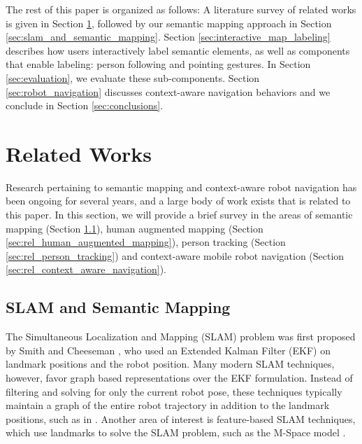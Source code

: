 \documentclass[3p]{elsarticle}
\begin{document}
The rest of this paper is organized as follows: A literature survey of related works is given in Section \ref{sec:related_works}, followed by our semantic mapping approach in Section \ref{sec:slam_and_semantic_mapping}. Section \ref{sec:interactive_map_labeling} describes how users interactively label semantic elements, as well as components that enable labeling: person following and pointing gestures. In Section \ref{sec:evaluation}, we evaluate these sub-components. Section \ref{sec:robot_navigation} discusses context-aware navigation behaviors and we conclude in Section \ref{sec:conclusions}.

\section{Related Works}
\label{sec:related_works}

Research pertaining to semantic mapping and context-aware robot navigation has been ongoing for several years, and a large body of work exists that is related to this paper. In this section, we will provide a brief survey in the areas of semantic mapping (Section \ref{sec:rel_slam_and_semantic_mapping}), human augmented mapping (Section \ref{sec:rel_human_augmented_mapping}), person tracking (Section \ref{sec:rel_person_tracking}) and context-aware mobile robot navigation (Section \ref{sec:rel_context_aware_navigation}).

\subsection{SLAM and Semantic Mapping}
\label{sec:rel_slam_and_semantic_mapping}

The Simultaneous Localization and Mapping (SLAM) problem was first proposed by
Smith and Cheeseman \cite{smith1986representation}, who used an Extended Kalman Filter (EKF) on landmark
positions and the robot position. Many modern SLAM techniques, however, favor graph
based representations over the EKF formulation. Instead of filtering and solving for only the current robot pose,
these techniques typically maintain a graph of the entire robot trajectory in addition to the landmark positions, such as in \cite{dellaert2006square}. Another area of interest is feature-based SLAM techniques, which use
landmarks to solve the SLAM problem, such as the M-Space model \cite{folkesson2007m}.
\end{document}
